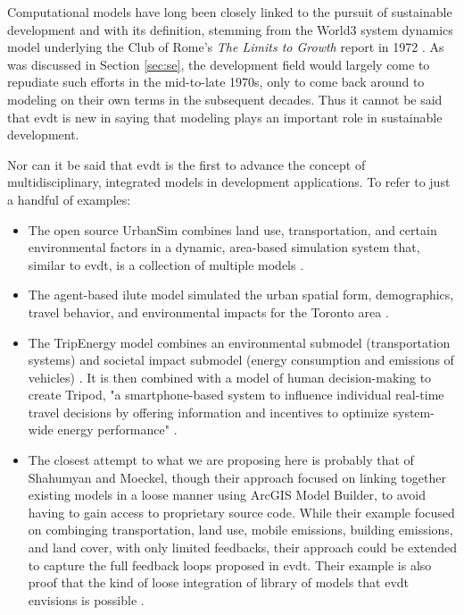 Computational models have long been closely linked to the pursuit of sustainable development and with its definition, stemming from the World3 system dynamics model underlying the Club of Rome's \textit{The Limits to Growth} report in 1972 \cite{meadowsLimitsGrowth1972}. As was discussed in Section \ref{sec:se}, the development field would largely come to repudiate such efforts in the mid-to-late 1970s, only to come back around to modeling on their own terms in the subsequent decades. Thus it cannot be said that \ac{evdt} is new in saying that modeling plays an important role in sustainable development. 

Nor can it be said that \ac{evdt} is the first to advance the concept of multidisciplinary, integrated models in development applications. To refer to just a handful of examples:

\begin{itemize} \setlength{\itemsep}{0pt} \setlength{\parskip}{0pt}
	\item{The open source UrbanSim combines land use, transportation, and certain environmental factors in a dynamic, area-based simulation system that, similar to \ac{evdt}, is a collection of multiple models \cite{waddellUrbanSimModelingUrban2002}.}
	\item{The agent-based \ac{ilute} model simulated the urban spatial form, demographics, travel behavior, and environmental impacts for the Toronto area \cite{millerHistoricalValidationIntegrated2011}.}
	\item{The TripEnergy model combines an environmental submodel (transportation systems) and societal impact submodel (energy consumption and emissions of vehicles) \cite{needellEfficientlySimulatingPersonal2018}. It is then combined with a model of human decision-making to create Tripod, "a smartphone-based system to influence individual real-time travel decisions by offering information and incentives to optimize system-wide energy performance" \cite{azevedoTripodSustainableTravel2018}.}
	\item{The closest attempt to what we are proposing here is probably that of Shahumyan and Moeckel, though their approach focused on linking together existing models in a loose manner using ArcGIS Model Builder, to avoid having to gain access to proprietary source code. While their example focused on combinging transportation, land use, mobile emissions, building emissions, and land cover, with only limited feedbacks, their approach could be extended to capture the full feedback loops proposed in \ac{evdt}. Their example is also proof that the kind of loose integration of library of models that \ac{evdt} envisions is possible \cite{shahumyanIntegrationLandUse2017}.}
\end{itemize} 

